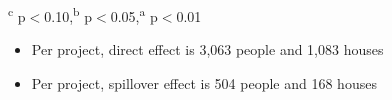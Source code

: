 \documentclass[aspectratio=32]{beamer}
\begin{document}
\begin{frame}
{\begin{tabular}{lCCCCC}
\bottomrule
\end{tabular}
}
{\footnotesize \textsuperscript{c} p$<$0.10,\textsuperscript{b} p$<$0.05,\textsuperscript{a} p$<$0.01}
\begin{itemize}
\item Per project, direct effect is 3,063 people and 1,083 houses
\item Per project, spillover effect is 504 people and  168  houses

\end{itemize}


\end{frame}
\end{document}
